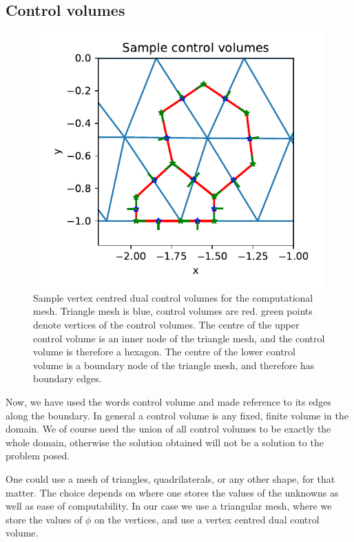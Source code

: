 \documentclass[sigconf]{acmart}
\begin{document}
\subsection{Control volumes}
\begin{figure}
	\centering
	\includegraphics[width=\linewidth]{control_volumes.pdf}
	\caption{Sample vertex centred dual control volumes for the computational mesh. Triangle mesh is blue, control volumes are red. green points denote vertices of the control volumes. The centre of the upper control volume is an inner node of the triangle mesh, and the control volume is therefore a hexagon. The centre of the lower control volume is a boundary node of the triangle mesh, and therefore has boundary edges.}
	\label{fig:control_volumes}
\end{figure}
Now, we have used the words control volume and made reference to its edges along the boundary. In general a control volume is any fixed, finite volume in the domain. We of course need the union of all control volumes to be exactly the whole domain, otherwise the solution obtained will not be a solution to the problem posed.

One could use a mesh of triangles, quadrilaterals, or any other shape, for that matter. The choice depends on where one stores the values of the unknowns as well as ease of computability. In our case we use a triangular mesh, where we store the values of $ \phi $ on the vertices, and use a vertex centred dual control volume. 
\end{document}

